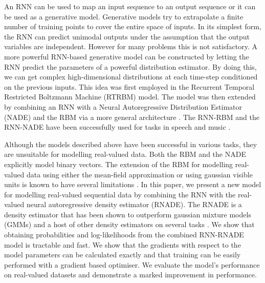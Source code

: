 \documentclass{article} %
\begin{document}
An RNN can be used to map an input sequence to an output sequence or it can be used as a generative model. Generative models try to extrapolate a finite number of training points to cover the entire space of inputs. In its simplest form, the RNN can predict unimodal outputs under the assumption that the output variables are independent. However for many problems this is not satisfactory. A more powerful RNN-based generative model can be constructed by letting the RNN predict the parameters of a powerful distribution estimator. By doing this, we can get complex high-dimensional distributions at each time-step conditioned on the previous inputs. This idea was first employed in the Recurrent Temporal Restricted Boltzmann Machine (RTRBM) \cite{Sutskever2008} model. The model was then extended by combining an RNN with a Neural Autoregressive Distribution Estimator (NADE) and the RBM via a more general architecture \cite{Boulanger-Lewandowski2012}. The RNN-RBM and the RNN-NADE have been successfully used for tasks in speech and music \cite{boulangerphone,Boulanger-Lewandowski2012}. 

Although the models described above have been successful in various tasks, they are unsuitable for modelling real-valued data. Both the RBM and the NADE explicitly model binary vectors. The extension of the RBM for modelling real-valued data using either the mean-field approximation or using gaussian visible units is known to have several limitations \cite{boulangerphone}. In this paper, we present a new model for modelling real-valued sequential data by combining the RNN with the real-valued neural autoregressive density estimator (RNADE). The RNADE is a density estimator that has been shown to outperform gaussian mixture models (GMMs) and a host of other density estimators on several tasks \cite{Uria2013}. We show that obtaining probabilities and log-likelihoods from the combined RNN-RNADE model is tractable and fast. We show that the gradients with respect to the model parameters can be calculated exactly and that training can be easily performed with a gradient based optimiser. We evaluate the model's performance on real-valued datasets and demonstrate a marked improvement in performance. 

\end{document}
